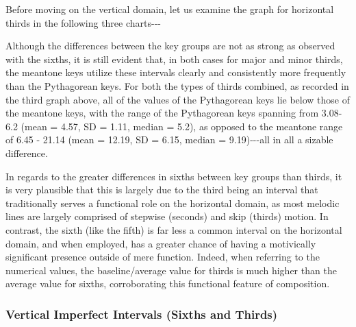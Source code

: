 Before moving on the vertical domain, let us examine the graph for
horizontal thirds in the following three charts-\/-\/-


    \begin{center}
    \end{center}
    


    \begin{center}
    \end{center}
    
    Although the differences between the key groups are not as strong as
observed with the sixths, it is still evident that, in both cases for
major and minor thirds, the meantone keys utilize these intervals
clearly and consistently more frequently than the Pythagorean keys. For
both the types of thirds combined, as recorded in the third graph above,
all of the values of the Pythagorean keys lie below those of the
meantone keys, with the range of the Pythagorean keys spanning from
3.08-6.2 (mean = 4.57, SD = 1.11, median = 5.2), as opposed to the
meantone range of 6.45 - 21.14 (mean = 12.19, SD = 6.15, median =
9.19)-\/-\/-all in all a sizable difference.

In regards to the greater differences in sixths between key groups than
thirds, it is very plausible that this is largely due to the third being
an interval that traditionally serves a functional role on the
horizontal domain, as most melodic lines are largely comprised of
stepwise (seconds) and skip (thirds) motion. In contrast, the sixth
(like the fifth) is far less a common interval on the horizontal domain,
and when employed, has a greater chance of having a motivically
significant presence outside of mere function. Indeed, when referring to
the numerical values, the baseline/average value for thirds is much
higher than the average value for sixths, corroborating this functional
feature of composition.

\subsubsection{Vertical Imperfect Intervals (Sixths and
Thirds)}\label{vertical-imperfect-intervals-sixths-and-thirds}

